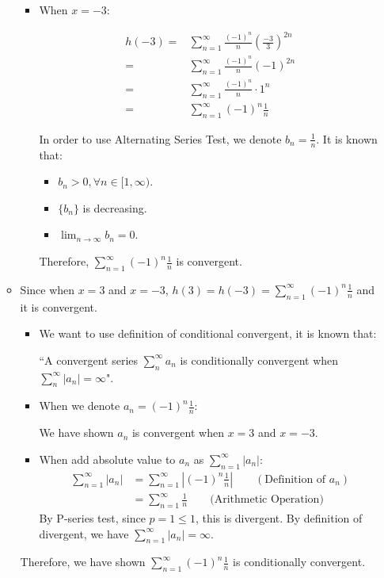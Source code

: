 \documentclass[12pt]{exam}
\begin{document}
\begin{enumerate}
\begin{itemize}
\begin{itemize}
		\item When $x = -3$:

		\begin{align*}
			h(-3)
			=& \sum_{n = 1}^{\infty} \frac{(-1)^n}{n}({\frac{-3}{3}})^{2n}\\
			=& \sum_{n = 1}^{\infty} \frac{(-1)^n}{n}(-1)^{2n} \\
			=& \sum_{n = 1}^{\infty} \frac{(-1)^n}{n}\cdot1^n \\
			=& \sum_{n = 1}^{\infty} (-1)^n\frac{1}{n}
		\end{align*}

		In order to use Alternating Series Test, we denote $b_n = \frac{1}{n}$. It is known that:
		\begin{itemize}
			\item $b_n > 0, \forall n\in[1, \infty)$.
			\item $\{b_n\}$ is decreasing.
			\item $\lim_{n \to \infty} b_n = 0$.
		\end{itemize}
		

		Therefore, $\sum_{n = 1}^{\infty} (-1)^n \frac{1}{n}$ is convergent.
	\end{itemize}
	\item Since when $x = 3$ and $x=-3$, $h(3)=h(-3)=\sum_{n = 1}^{\infty} (-1)^n\frac{1}{n}$ and it is convergent.
	\begin{itemize}
	    \item We want to use definition of conditional convergent, it is known that:
	    
	        ``A convergent series $\sum_{n}^\infty a_n$ is conditionally convergent when $\sum_{n}^\infty |a_n|=\infty$".
	    
	    \item When we denote $a_n=(-1)^n\frac{1}{n}$:
	    
            We have shown $a_n$ is convergent when $x=3$ and $x=-3$.
        
        \item When add absolute value to $a_n$ as $\sum_{n=1}^\infty |a_n|$:
        \begin{align*}
            \sum_{n=1}^\infty |a_n|
            &=\sum_{n=1}^\infty |(-1)^n\frac{1}{n}| \qquad(\mbox{Definition of } a_n)\\
            &=\sum_{n=1}^\infty \frac{1}{n} \qquad\mbox{(Arithmetic Operation)}
        \end{align*}
        By P-series test, since $p=1 \leq 1$, this is divergent. By definition of divergent, we have $\sum_{n=1}^\infty |a_n|=\infty$.
	\end{itemize}
	Therefore, we have shown $\sum_{n = 1}^{\infty} (-1)^n\frac{1}{n}$ is conditionally convergent.
\end{itemize}


\end{enumerate}
\end{document}
